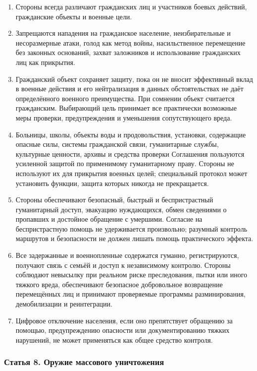 \documentclass[
  russian,
  11pt,
  a4paper,
]{article}
\providecommand{\tightlist}{%
  \setlength{\itemsep}{0pt}\setlength{\parskip}{0pt}}
\begin{document}
\begin{enumerate}
\def\labelenumi{\arabic{enumi}.}
\tightlist
\item
  Стороны всегда различают гражданских лиц и участников боевых действий,
  гражданские объекты и военные цели.
\item
  Запрещаются нападения на гражданское население, неизбирательные и
  несоразмерные атаки, голод как метод войны, насильственное перемещение
  без законных оснований, захват заложников и использование гражданских
  лиц как прикрытия.
\item
  Гражданский объект сохраняет защиту, пока он не вносит эффективный
  вклад в военные действия и его нейтрализация в данных обстоятельствах
  не даёт определённого военного преимущества. При сомнении объект
  считается гражданским. Выбирающий цель принимает все практически
  возможные меры проверки, предупреждения и уменьшения сопутствующего
  вреда.
\item
  Больницы, школы, объекты воды и продовольствия, установки, содержащие
  опасные силы, системы гражданской связи, гуманитарные службы,
  культурные ценности, архивы и средства проверки Соглашения пользуются
  усиленной защитой по применимому гуманитарному праву. Стороны не
  используют их для прикрытия военных целей; специальный протокол может
  установить функции, защита которых никогда не прекращается.
\item
  Стороны обеспечивают безопасный, быстрый и беспристрастный
  гуманитарный доступ, эвакуацию нуждающихся, обмен сведениями о
  пропавших и достойное обращение с умершими. Согласие на
  беспристрастную помощь не удерживается произвольно; разумный контроль
  маршрутов и безопасности не должен лишать помощь практического
  эффекта.
\item
  Все задержанные и военнопленные содержатся гуманно, регистрируются,
  получают связь с семьёй и доступ к независимому контролю. Стороны
  соблюдают невысылку при реальном риске преследования, пытки или иного
  тяжкого вреда, обеспечивают безопасное добровольное возвращение
  перемещённых лиц и принимают проверяемые программы разминирования,
  демобилизации и реинтеграции.
\item
  Цифровое отключение населения, если оно препятствует обращению за
  помощью, предупреждению опасности или документированию тяжких
  нарушений, не может применяться как общее средство контроля.
\end{enumerate}

\subsubsection{Статья 8. Оружие массового
уничтожения}\label{ux441ux442ux430ux442ux44cux44f-8-ux43eux440ux443ux436ux438ux435-ux43cux430ux441ux441ux43eux432ux43eux433ux43e-ux443ux43dux438ux447ux442ux43eux436ux435ux43dux438ux44f}
\end{document}
